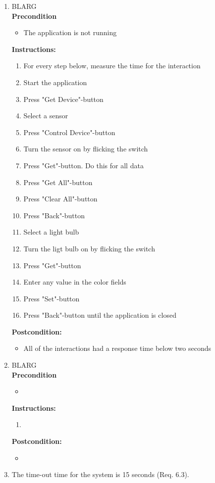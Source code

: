 \documentclass[a4paper]{article}
\newlength{\testlabellength}
\newenvironment{testlist}{\begin{enumerate}[label=\bfseries Instruction \thesubsection.\arabic* , labelindent=0pt, labelwidth=\testlabellength , leftmargin=2cm]}{\end{enumerate}}
\newenvironment{precondition}{
{\color{white}BLARG}\\ 
\textbf{Precondition}
\begin{itemize}[labelindent=0cm, labelwidth=2cm , leftmargin=1cm]
}
{\end{itemize}}
\newenvironment{instruction}{
\textbf{Instructions:}
\begin{enumerate}[label=\bfseries  \arabic*., labelindent=0cm, labelwidth=2cm , leftmargin=1cm]
}
{\end{enumerate}}
\newenvironment{postcondition}{
\textbf{Postcondition:}
\begin{itemize}[labelindent=0cm, labelwidth=2cm , leftmargin=1cm]
}
{\end{itemize}}
\begin{document}
\begin{appendices}
\begin{testlist}
	\item
		\begin{precondition}
			\item The application is not running
		\end{precondition}
		\begin{instruction}
        	\item For every step below, measure the time for the interaction
			\item Start the application
            \item Press "Get Device"-button
            \item Select a sensor
            \item Press "Control Device"-button
            \item Turn the sensor on by flicking the switch
            \item Press "Get"-button. Do this for all data
            \item Press "Get All"-button
            \item Press "Clear All"-button
            \item Press "Back"-button
            \item Select a light bulb
            \item Turn the ligt bulb on by flicking the switch
            \item Press "Get"-button
            \item Enter any value in the color fields
            \item Press "Set"-button
            \item Press "Back"-button until the application is closed
		\end{instruction}
		\begin{postcondition}
			\item All of the interactions had a response time below two seconds
		\end{postcondition}

	\item
		\begin{precondition} 
			\item 
		\end{precondition}
		\begin{instruction}
			\item
		\end{instruction}
		\begin{postcondition}
			\item
		\end{postcondition}
\item The time-out time for the system is 15 seconds (Req. 6.3). 
	
\end{testlist}

\clearpage

\end{appendices}
\end{document}
